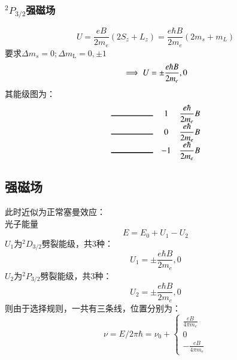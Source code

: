 \documentclass[UTF8,9pt]{ctexart}
\begin{document}
            \subsubsection{${}^2P_{3/2}$强磁场}
            $$U = \frac { e B } { 2 m _ { e } } \left( 2 S _ { z } + L _ { z } \right) = \frac { e \hbar B } { 2 m _ { e } } \left( 2 m _s + m _ { L } \right)$$
            要求$ \Delta  m _ { s } = 0 ; \Delta m _ { \mathrm { L } } = 0 , \pm 1$
            $$\implies U=\pm\frac { e \hbar B } { 2 m _ { e } },0$$
            其能级图为：$$\begin{matrix}
                \rule{50pt}{1pt}& 1 & \dfrac{e\hbar}{2m_e} B\\
                \rule{50pt}{1pt}& 0 & \dfrac{e\hbar}{2m_e} B\\
                \rule{50pt}{1pt}& -1 & \dfrac{e\hbar}{2m_e} B
            \end{matrix}$$
                \subsection{强磁场}
                此时近似为正常塞曼效应：\\
                光子能量$$E=E_0+U_1-U_2$$
                $U_1$为${}^2D_{3/2}$劈裂能级，共3种：
                $$U_1=\pm\frac { e \hbar B } { 2 m _ { e } },0$$
                $U_2$为${}^2P_{3/2}$劈裂能级，共3种：
                $$U_2=\pm\frac { e \hbar B } { 2 m _ { e } },0$$
                则由于选择规则，一共有三条线，位置分别为：
                $$\nu=E/2\pi\hbar=\nu_0+\left\{\begin{matrix}
                    \frac { e B } { 4\pi m _ { e } }\\
                    0\\
                    -\frac { e B } { 4\pi m _ { e } }
                \end{matrix}\right.$$
\end{document}
